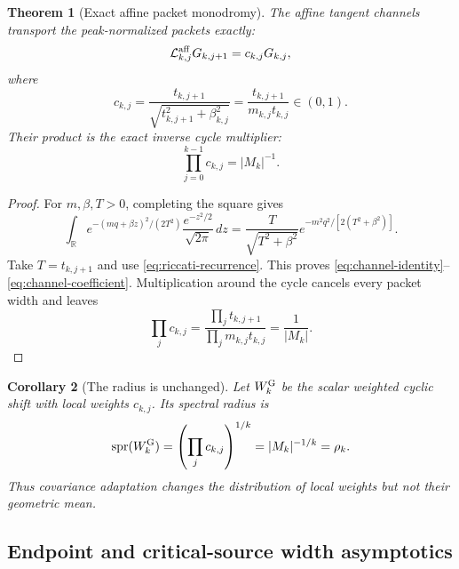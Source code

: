 \documentclass[11pt]{article}
\newtheorem{theorem}{Theorem}[section]
\newtheorem{corollary}[theorem]{Corollary}
\theoremstyle{definition}
\theoremstyle{remark}
\newcommand{\R}{\mathbb R}
\newcommand{\cL}{\mathcal L}
\newcommand{\spr}{\operatorname{spr}}
\begin{document}
\begin{theorem}[Exact affine packet monodromy]
\label{thm:packet-monodromy}
The affine tangent channels transport the peak-normalized packets exactly:
\begin{equation}\label{eq:channel-identity}
 \cL_{k,j}^{\rm aff}G_{k,j+1}
 =c_{k,j}G_{k,j},
\end{equation}
where
\begin{equation}\label{eq:channel-coefficient}
 c_{k,j}
 =\frac{t_{k,j+1}}
 {\sqrt{t_{k,j+1}^2+\beta_{k,j}^2}}
 =\frac{t_{k,j+1}}{m_{k,j}t_{k,j}}
 \in(0,1).
\end{equation}
Their product is the exact inverse cycle multiplier:
\begin{equation}\label{eq:coefficient-product}
 \boxed{\prod_{j=0}^{k-1}c_{k,j}=|M_k|^{-1}.}
\end{equation}
\end{theorem}

\begin{proof}
For $m,\beta,T>0$, completing the square gives
\begin{equation}\label{eq:gaussian-integral}
 \int_\R
 e^{-(mq+\beta z)^2/(2T^2)}
 \frac{e^{-z^2/2}}{\sqrt{2\pi}}\,dz
 =\frac{T}{\sqrt{T^2+\beta^2}}
 e^{-m^2q^2/[2(T^2+\beta^2)]}.
\end{equation}
Take $T=t_{k,j+1}$ and use
\eqref{eq:riccati-recurrence}.  This proves
\eqref{eq:channel-identity}--\eqref{eq:channel-coefficient}.  Multiplication
around the cycle cancels every packet width and leaves
\[
 \prod_jc_{k,j}
 =\frac{\prod_jt_{k,j+1}}
 {\prod_jm_{k,j}t_{k,j}}
 =\frac1{|M_k|}.
\]
\end{proof}

\begin{corollary}[The radius is unchanged]
\label{cor:packet-radius}
Let $W_k^{\rm G}$ be the scalar weighted cyclic shift with local weights
$c_{k,j}$.  Its spectral radius is
\begin{equation}\label{eq:packet-radius}
 \spr(W_k^{\rm G})
 =\left(\prod_jc_{k,j}\right)^{1/k}
 =|M_k|^{-1/k}=\rho_k.
\end{equation}
Thus covariance adaptation changes the distribution of local weights but not
their geometric mean.
\end{corollary}

\subsection{Endpoint and critical-source width asymptotics}
\end{document}

